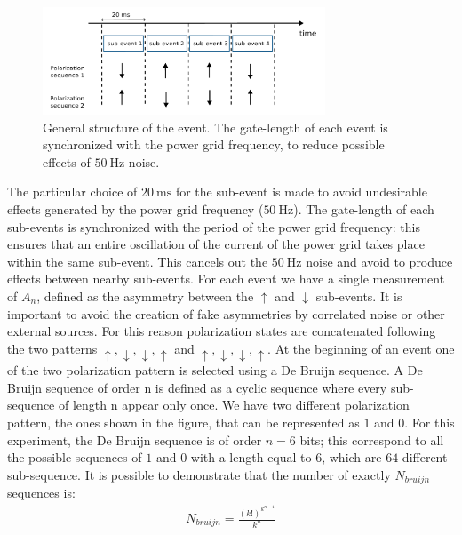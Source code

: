 \begin{figure}[hbtp] 
\centering
\includegraphics[width = 0.75\textwidth]{ExperimentalSetup/EventStructure.pdf}
\caption{General structure of the event. The gate-length of each event is synchronized with the power grid frequency, to reduce possible effects of $\SI{50}{\hertz}$ noise.}
\label{fig:EventStructure}
\end{figure}

The particular choice of $\SI{20}{\milli \second}$ for the sub-event is made to avoid undesirable effects generated by the power grid frequency ($\SI{50}{\hertz}$). The gate-length of each sub-events is synchronized with the period of the power grid frequency: this ensures that an entire oscillation of the current of the power grid takes place within the same sub-event. This cancels out the $\SI{50}{\hertz}$ noise and avoid to produce effects between nearby sub-events.
For each event we have a single measurement of $A_{n}$, defined as the asymmetry between the $\uparrow$ and $\downarrow$ sub-events. It is important to avoid the creation of fake asymmetries by correlated noise or other external sources. For this reason polarization states are concatenated following the two patterns $\uparrow, \downarrow, \downarrow, \uparrow$ and $\uparrow, \downarrow, \downarrow, \uparrow$. At the beginning of an event one of the two polarization pattern is selected using a De Bruijn sequence. A De Bruijn sequence of order n is defined as a cyclic sequence where every sub-sequence of length n appear only once. We have two different polarization pattern, the ones shown in the figure, that can be represented as $1$ and $0$. For this experiment, the De Bruijn sequence is of order $n = 6$ bits; this correspond to all the possible sequences of $1$ and $0$ with a length equal to $6$, which are $64$ different sub-sequence.
It is possible to demonstrate that the number of exactly $N_{bruijn}$ sequences is: 
\begin{align*}
N_{bruijn} = \frac{(k!)^{k^{n-1}}}{k^{n}}
\end{align*}
